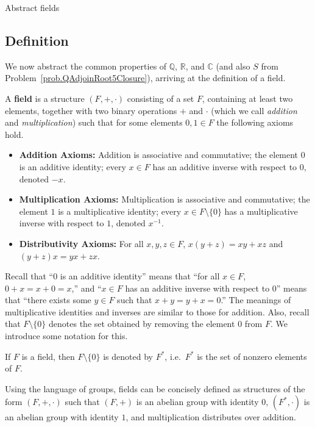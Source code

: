 \begin{section}{Abstract fields}
\subsection{Definition}

We now abstract the common properties of $\mathbb{Q}$, $\mathbb{R}$, and $\mathbb{C}$ (and also $S$ from Problem~\ref{prob.QAdjoinRoot5Closure}), arriving at the definition of a field. 

\begin{definition}
A \textbf{field} is a structure $(F,+,\cdot)$ consisting of a set $F$, containing at least two elements, together with two binary operations $+$ and $\cdot$ (which we call \emph{addition} and \emph{multiplication}) such that for some elements $0,1\in F$ the following axioms hold.
\begin{itemize}
\item \textbf{Addition Axioms:} Addition is associative and commutative; the element $0$ is an additive identity; every  $x\in F$ has an additive inverse with respect to $0$, denoted $-x$.
\item \textbf{Multiplication Axioms:} Multiplication is associative and commutative; the element $1$ is a multiplicative identity;  every $x\in F\setminus\{0\}$ has a multiplicative inverse with respect to $1$, denoted $x^{-1}$.
\item \textbf{Distributivity Axioms:} For all $x,y,z \in F$, $x(y+z) = xy+xz$ and $(y+z)x = yx+zx$.
\end{itemize}
\end{definition}

Recall that ``$0$ is an additive identity'' means that ``for all $x\in F$, $0+x = x+0 = x$,'' and ``$x\in F$ has an additive inverse with respect to $0$'' means that ``there exists some $y\in F$ such that $x+y = y+x = 0$.'' The meanings of multiplicative identities and inverses are similar to those for addition. Also, recall that $F\setminus\{0\}$ denotes the set obtained by removing the element $0$ from $F$. We introduce some notation for this.

\begin{definition}
If $F$ is a field, then $F\setminus\{0\}$ is denoted by $F^*$, i.e.~$F^*$ is the set of nonzero elements of $F$.
\end{definition}

Using the language of groups, fields can be concisely defined as structures of the form $(F,+,\cdot)$ such that $(F,+)$ is an abelian group with identity $0$,  $(F^*,\cdot)$ is an abelian group with identity $1$, and multiplication distributes over addition.


\end{section}
